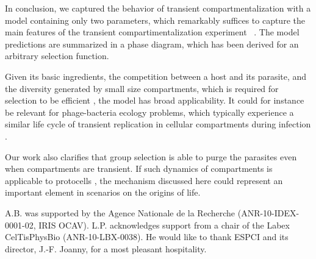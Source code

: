 \documentclass[twocolumn,showpacs,floatfix]{revtex4-1}
\begin{document}
In conclusion, we captured the behavior of transient compartmentalization with a model containing only two parameters, which   
remarkably suffices to capture the main features of the transient compartimentalization experiment ~\cite{Matsumura2016}.  
The model predictions are summarized in a phase diagram, which has been derived for an arbitrary selection 
function. 


Given its basic ingredients, the competition between a host and its parasite, 
and the diversity generated by small size compartments, 
which is required for selection to be efficient \cite{Fisher1930}, 
the model has broad applicability. It could for instance be relevant  
for phage-bacteria ecology problems, which typically experience a similar life cycle of transient replication in cellular compartments during infection \cite{Sneppen2014}. 

Our work also clarifies that group selection 
is able to purge the parasites even when compartments are transient. If such dynamics of compartments is applicable to 
protocells \cite{Oparin1952}, the mechanism discussed here  
 could represent an important element in scenarios on the origins of life. 
 

A.B. was supported by the Agence Nationale de la Recherche 
(ANR-10-IDEX-0001-02, IRIS OCAV).
L.P. acknowledges support from a chair of the Labex CelTisPhysBio (ANR-10-LBX-0038).
He would like to thank ESPCI and its director, J.-F. Joanny, for a most pleasant hospitality. 
\end{document}

